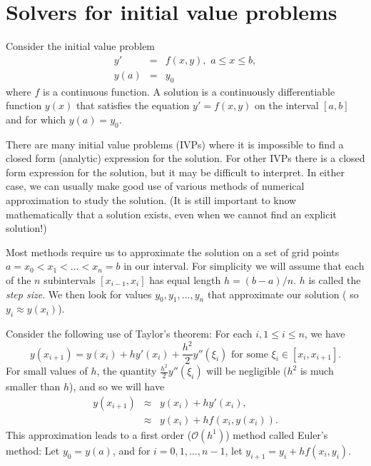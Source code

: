 \label{lab:IVP}


\section{Solvers for initial value problems}

Consider the initial value problem 
\begin{eqnarray*}
y' &=& f(x,y),\,\, a \leq x \leq b, \\
y(a) &=& y_0
\end{eqnarray*}
where $f$ is a continuous function. A solution is a continuously differentiable function $y(x)$ that satisfies the equation $y' = f(x,y)$ on the interval $[a,b]$ and for which $y(a) = y_0$.  


There are many initial value problems (IVPs) where it is impossible to find a closed form (analytic) expression for the solution. 
For other IVPs there is a closed form expression for the solution, but it may be difficult to interpret. 
In either case, we can usually make good use of various methods of numerical approximation to study the solution. (It is still important to know mathematically that a solution exists, even when we cannot find an explicit solution!)

Most methods require us to approximate the solution on a set of grid points $a = x_0< x_1<\hdots< x_n = b$ in our interval.  For simplicity we will assume that each of the $n$ subintervals $[x_{i-1},x_i]$ has equal length $h = (b-a)/n$. $h$ is called the \textit{step size}. We then look for values $y_0,y_1, \hdots, y_n$ that approximate our solution ( so $y_i \approx y(x_i)$).  

Consider the following use of Taylor's theorem: For each $i, 1 \leq i \leq n$, we have
\[
y(x_{i+1}) = y(x_{i}) + h y'(x_i) + \frac{h^2}{2} y''(\xi_i)\text{ for some }\xi_i \in [x_i,x_{i+1}].
\]
For small values of $h$, the quantity $\frac{h^2}{2} y''(\xi_i)$ will be negligible ($h^2$ is much smaller than $h$), and so we will have
\begin{eqnarray*}
y(x_{i+1}) &\approx& y(x_{i}) + h y'(x_i)  ,\\
&\approx & y(x_{i}) + h f(x_i,y(x_i)).
\end{eqnarray*}
This approximation leads to a first order ($\mathcal{O}(h^1)$) method called Euler's method: Let $y_0 = y(a)$, and for $i = 0, 1, \hdots, n-1$, let $y_{i+1} = y_i +hf(x_i,y_i)$. 

